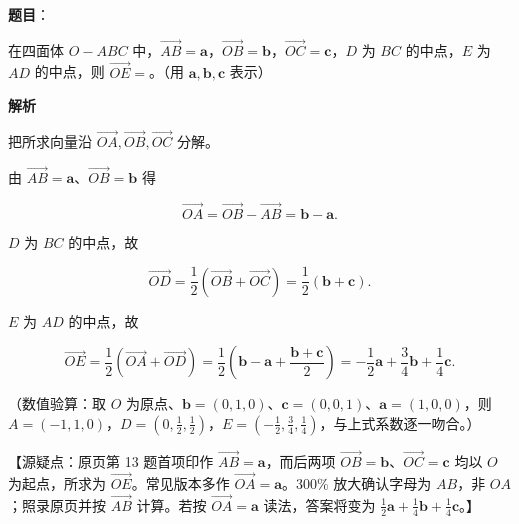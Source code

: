 \begin{answer}

\textbf{题目}：

在四面体 $O-ABC$ 中，$\overrightarrow{AB}=\boldsymbol a$，$\overrightarrow{OB}=\boldsymbol b$，$\overrightarrow{OC}=\boldsymbol c$，$D$ 为 $BC$ 的中点，$E$ 为 $AD$ 的中点，则 $\overrightarrow{OE}=$\gkblank{}。（用 $\boldsymbol a,\boldsymbol b,\boldsymbol c$ 表示）

\textbf{解析}

把所求向量沿 $\overrightarrow{OA},\overrightarrow{OB},\overrightarrow{OC}$ 分解。

由 $\overrightarrow{AB}=\boldsymbol a$、$\overrightarrow{OB}=\boldsymbol b$ 得

\nopagebreak[4]
\[\overrightarrow{OA}=\overrightarrow{OB}-\overrightarrow{AB}=\boldsymbol b-\boldsymbol a.\]

$D$ 为 $BC$ 的中点，故

\nopagebreak[4]
\[\overrightarrow{OD}=\frac12\left(\overrightarrow{OB}+\overrightarrow{OC}\right)=\frac12(\boldsymbol b+\boldsymbol c).\]

$E$ 为 $AD$ 的中点，故

\nopagebreak[4]
\[\overrightarrow{OE}=\frac12\left(\overrightarrow{OA}+\overrightarrow{OD}\right)=\frac12\left(\boldsymbol b-\boldsymbol a+\frac{\boldsymbol b+\boldsymbol c}{2}\right)=-\frac12\boldsymbol a+\frac34\boldsymbol b+\frac14\boldsymbol c.\]

（数值验算：取 $O$ 为原点、$\boldsymbol b=(0,1,0)$、$\boldsymbol c=(0,0,1)$、$\boldsymbol a=(1,0,0)$，则 $A=(-1,1,0)$，$D=\left(0,\frac12,\frac12\right)$，$E=\left(-\frac12,\frac34,\frac14\right)$，与上式系数逐一吻合。）

【源疑点：原页第 13 题首项印作 $\overrightarrow{AB}=\boldsymbol a$，而后两项 $\overrightarrow{OB}=\boldsymbol b$、$\overrightarrow{OC}=\boldsymbol c$ 均以 $O$ 为起点，所求为 $\overrightarrow{OE}$。常见版本多作 $\overrightarrow{OA}=\boldsymbol a$。300\% 放大确认字母为 $AB$，非 $OA$；照录原页并按 $\overrightarrow{AB}$ 计算。若按 $\overrightarrow{OA}=\boldsymbol a$ 读法，答案将变为 $\frac12\boldsymbol a+\frac14\boldsymbol b+\frac14\boldsymbol c$。】


\end{answer}
